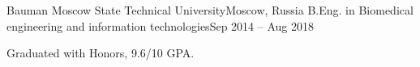 \resumeSubheading
{Bauman Moscow State Technical University}{Moscow, Russia}
{B.Eng. in Biomedical engineering and information technologies}{Sep 2014 -- Aug 2018}
\begin{itemize}[leftmargin=0in, label={}]
    \small{\item{
        {Graduated with Honors, 9.6/10 GPA.}\\
    }}
\end{itemize}
